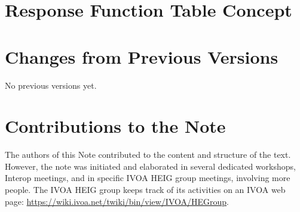 \documentclass[11pt,a4paper]{ivoa}
\begin{document}
\pagebreak
\section{Response Function Table Concept}\label{sec:accessoptionsappendix}




\pagebreak
\section{Changes from Previous Versions}

No previous versions yet.

\pagebreak
\section{Contributions to the Note}

The authors of this Note contributed to the content and structure of the text. However, the note was initiated and elaborated in several dedicated workshops, Interop meetings, and in specific \gls{IVOA} \gls{HEIG} group meetings, involving more people. The \gls{IVOA} \gls{HEIG} group keeps track of its activities on an \gls{IVOA} web page: \url{https://wiki.ivoa.net/twiki/bin/view/IVOA/HEGroup}.
\end{document}
